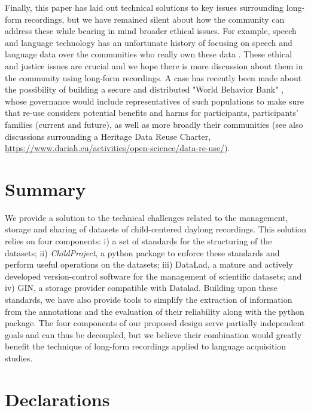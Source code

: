 \documentclass[smallextended]{svjour3}       %
\begin{document}
Finally, this paper has laid out technical solutions to key issues surrounding long-form recordings, but we have remained silent about how the community can address these while bearing in mind broader ethical issues. For example, speech and language technology has an unfortunate history of focusing on speech and language data over the communities who really own these data \citep{bird2020decolonising}. These ethical and justice issues are crucial and we hope there is more discussion about them in the community using long-form recordings. A case has recently been made about the possibility of building a secure and distributed "World Behavior Bank" \citep{cychosz2021using}, whose governance would include representatives of such populations to make sure that re-use considers potential benefits and harms for participants, participants' families (current and future), as well as more broadly their communities (see also discussions surrounding a Heritage Data Reuse Charter, \url{https://www.dariah.eu/activities/open-science/data-re-use/}).

\section{Summary}


We provide a solution to the technical challenges related to the management, storage and sharing of datasets of child-centered daylong recordings. This solution relies on four components: i) a set of standards for the structuring of the datasets; ii) \emph{ChildProject}, a python package to enforce these standards and perform useful operations on the datasets; iii) DataLad, a mature and actively developed version-control software for the management of scientific datasets; and iv) GIN, a storage provider compatible with Datalad. Building upon these standards, we have also provide tools to simplify the extraction of information from the annotations and the evaluation of their reliability along with the python package. The four components of our proposed design serve partially independent goals and can thus be decoupled, but we believe their combination would greatly benefit the technique of long-form recordings applied to language acquisition studies.

\section*{Declarations}
\end{document}
